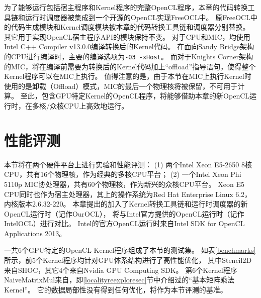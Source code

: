 为了能够运行包括宿主程序和Kernel程序的完整OpenCL程序，本章的代码转换工具链和运行时调度器被集成到一个开源的OpenCL实现\pozhehao FreeOCL中。
原FreeOCL中的代码生成模块和Kernel调度模块被本章的代码转换工具链和调度器分别替换。
其它用于实现OpenCL宿主程序API的模块保持不变。
对于CPU和MIC，均使用Intel C++ Compiler v13.0.0编译转换后的Kernel代码。
在面向Sandy Bridge架构的CPU进行编译时，主要的编译选项为\texttt{-O3 -xHost}。
而对于Knights Corner架构的MIC，将在编译前需要为转换后的Kernel代码加上``offload''指导语句，使得整个Kernel程序可以在MIC上执行。
值得注意的是，由于本节在MIC上执行Kernel时使用的是卸载（Offload）模式，MIC的最后一个物理核将被保留，不可用于计算。
至此，包含GPU特定Kernel的OpenCL程序，将能够借助本章的新OpenCL运行时，在多核/众核CPU上高效地运行。

\section{性能评测}
\label{kernelexperimentsec}
本节将在两个硬件平台上进行实验和性能评测：
(1) 两个Intel Xeon E5-2650 8核CPU，共有16个物理核，作为经典的多核CPU平台；
(2) 一个Intel Xeon Phi 5110p MIC协处理器，共有60个物理核，作为新兴的众核CPU平台。
Xeon E5 CPU同时也作为宿主处理器，其上的操作系统为Red Hat Enterprise Linux 6.2，内核版本2.6.32-220。
本章提出的加入了Kernel转换工具链和运行时调度器的新OpenCL运行时（记作OurOCL），
将与Intel官方提供的OpenCL运行时（记作IntelOCL）进行对比。
Intel的官方OpenCL运行时来自Intel SDK for OpenCL Applications 2013。

一共6个GPU特定的OpenCL Kernel程序组成了本节的测试集。
如表\ref{benchmarks}所示，前5个Kernel程序均针对GPU体系结构进行了高性能优化，
其中Stencil2D来自SHOC，其它4个来自Nvidia GPU Computing SDK。
第6个Kernel程序NaiveMatrixMul来自\cite{oclprogrammingguide}，即\ref{localityreexploresec}节中介绍过的``基本矩阵乘法Kernel''。
它的数据局部性没有得到任何优化，将作为本节评测的基准。

